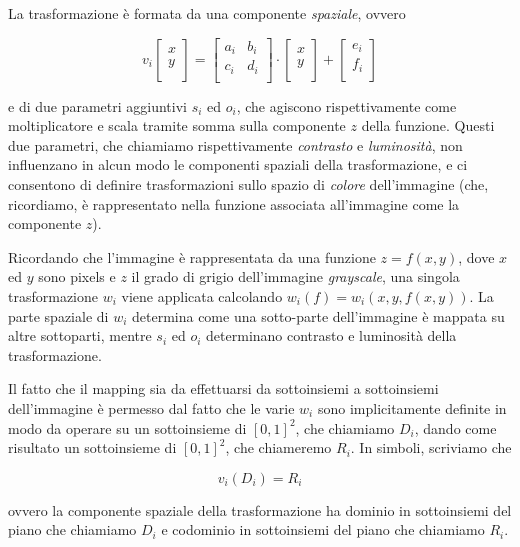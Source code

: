 \documentclass[11pt,a4paper,appendixprefix=true,numbers=noenddot]{scrreprt}
\begin{document}
La trasformazione è formata da una componente \emph{spaziale}, ovvero

\[
v_i \begin{bmatrix} 
x \\
y \\
\end{bmatrix} = \begin{bmatrix}
a_i & b_i \\
c_i & d_i \\
\end{bmatrix} \cdot \begin{bmatrix} 
x \\
y \\
\end{bmatrix} + \begin{bmatrix} 
e_i \\
f_i \\
\end{bmatrix}
\]

e di due parametri aggiuntivi $s_i$ ed $o_i$, che agiscono rispettivamente come moltiplicatore e scala tramite somma sulla componente $z$ della funzione. Questi due parametri, che chiamiamo rispettivamente \emph{contrasto} e \emph{luminosità}, non influenzano in alcun modo le componenti spaziali della trasformazione, e ci consentono di definire trasformazioni sullo spazio di \emph{colore} dell'immagine (che, ricordiamo, è rappresentato nella funzione associata all'immagine come la componente $z$). 

Ricordando che l'immagine è rappresentata da una funzione $z = f(x,y)$, dove $x$ ed $y$ sono pixels e $z$ il grado di grigio dell'immagine \emph{grayscale}, una singola trasformazione $w_i$ viene applicata calcolando $w_i(f) = w_i(x, y, f(x,y))$. La parte spaziale di $w_i$ determina come una sotto-parte dell'immagine è mappata su altre sottoparti, mentre $s_i$ ed $o_i$ determinano contrasto e luminosità della trasformazione.

Il fatto che il mapping sia da effettuarsi da sottoinsiemi a sottoinsiemi dell'immagine è permesso dal fatto che le varie $w_i$ sono implicitamente definite in modo da operare su un sottoinsieme di $[0,1]^2$, che chiamiamo $D_i$, dando come risultato un sottoinsieme di $[0,1]^2$, che chiameremo $R_i$. In simboli, scriviamo che

\[
v_i(D_i) = R_i
\]

ovvero la componente spaziale della trasformazione ha dominio in sottoinsiemi del piano che chiamiamo $D_i$ e codominio in sottoinsiemi del piano che chiamiamo $R_i$.
\end{document}
